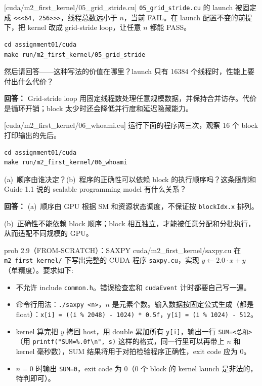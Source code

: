 \documentclass[11pt,a4paper,fontset=windows]{ctexart}
\begin{document}
[cuda/m2\_first\_kernel/05\_grid\_stride.cu]
\texttt{05\_grid\_stride.cu} 的 launch 被固定成 \texttt{<<<64, 256>>>}，线程总数远小于 $n$，当前 FAIL。在 launch 配置不变的前提下，把 kernel 改成 grid-stride loop，让任意 $n$ 都能 PASS。

\begin{lstlisting}
cd assignment01/cuda
make run/m2_first_kernel/05_grid_stride
\end{lstlisting}

然后请回答——这种写法的价值在哪里？launch 只有 16384 个线程时，性能上要付出什么代价？

\par\textbf{回答：} Grid-stride loop 用固定线程数处理任意规模数据，并保持合并访存。代价是循环开销；block 太少时还会降低并行度和延迟隐藏能力。

[cuda/m2\_first\_kernel/06\_whoami.cu]
运行下面的程序两三次，观察 16 个 block 打印输出的先后。

\begin{lstlisting}
cd assignment01/cuda
make run/m2_first_kernel/06_whoami
\end{lstlisting}

(a)~顺序由谁决定？(b)~程序的正确性可以依赖 block 的执行顺序吗？这条限制和 Guide 1.1 说的 scalable programming model 有什么关系？

\par\textbf{回答：} (a)~顺序由 GPU 根据 SM 和资源状态调度，不保证按 \texttt{blockIdx.x} 排列。

(b)~正确性不能依赖 block 顺序；block 相互独立，才能被任意分配和分批执行，从而适配不同规模的 GPU。

\begin{capstone}{prob 2.9（FROM-SCRATCH）：SAXPY \hfill {\footnotesize\ttfamily cuda/m2\_first\_kernel/saxpy.cu}}
在 \texttt{m2\_first\_kernel/} 下写出完整的 CUDA 程序 \texttt{saxpy.cu}，实现 $y \leftarrow 2.0 \cdot x + y$（单精度）。要求如下:
\begin{itemize}
  \item 不允许 include \texttt{common.h}。错误检查宏和 \texttt{cudaEvent} 计时都要自己写一遍。
  \item 命令行用法：\texttt{./saxpy <n>}，$n$ 是元素个数。输入数据按固定公式生成（都是 float）：\texttt{x[i] = ((i \% 2048) - 1024) * 0.5f}，\texttt{y[i] = (i \% 1024) - 512}。
  \item kernel 算完把 $y$ 拷回 host，用 double 累加所有 \texttt{y[i]}，输出一行 \texttt{SUM=<总和>}（用 \texttt{printf("SUM=\%.0f\textbackslash n", s)} 这样的格式，同一行里可以再带上 $n$ 和 kernel 毫秒数），SUM 结果将用于对拍检验程序正确性，exit code 应为 0。
  \item $n = 0$ 时输出 \texttt{SUM=0}，exit code 为 0（0 个 block 的 kernel launch 是非法的，特判即可）。
\end{itemize}
\end{capstone}
\end{document}
